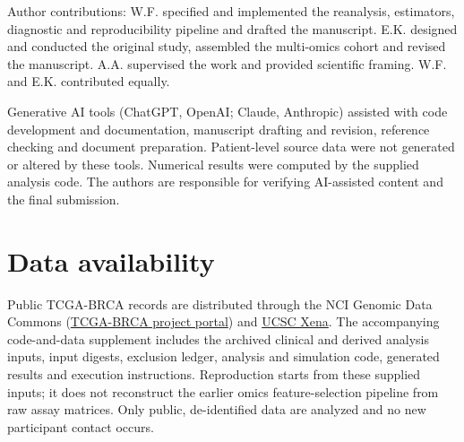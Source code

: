 \documentclass[12pt,letterpaper]{article}
\begin{document}
Author contributions: W.F. specified and implemented the reanalysis, estimators, diagnostic and
reproducibility pipeline and drafted the manuscript. E.K. designed and conducted the original study,
assembled the multi-omics cohort and revised the manuscript. A.A. supervised the work and provided
scientific framing. W.F. and E.K. contributed equally.

Generative AI tools (ChatGPT, OpenAI; Claude, Anthropic) assisted with code development and documentation,
manuscript drafting and revision, reference checking and document preparation. Patient-level source data
were not generated or altered by these tools. Numerical results were computed by the supplied analysis code.
The authors are responsible for verifying AI-assisted content and the final submission.

\section*{Data availability}
Public TCGA-BRCA records are distributed through the NCI Genomic Data Commons
(\href{https://portal.gdc.cancer.gov/projects/TCGA-BRCA}{TCGA-BRCA project portal})
and \href{https://xenabrowser.net}{UCSC Xena}.
The accompanying code-and-data supplement includes the archived clinical and derived analysis inputs,
input digests, exclusion ledger, analysis and simulation code, generated results and execution instructions.
Reproduction starts from these supplied inputs; it does not reconstruct the earlier omics feature-selection
pipeline from raw assay matrices. Only public, de-identified data are analyzed and no new participant contact occurs.
\end{document}
